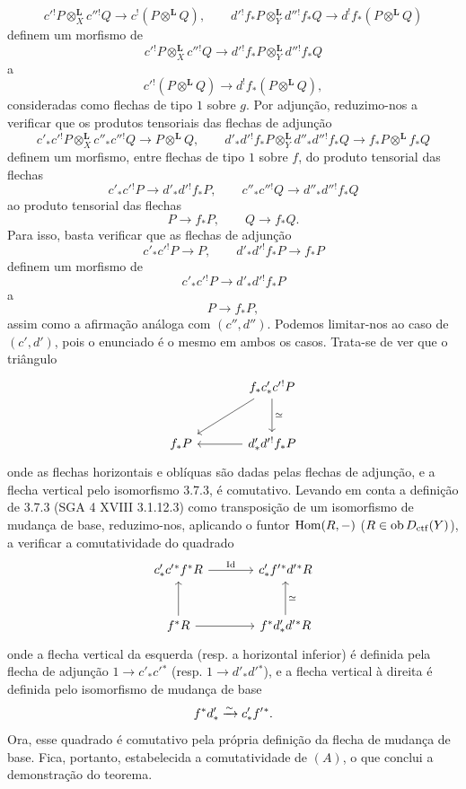 \begin{prooftext}[Demonstração]
\[
c'{}^!P\otimes_X^{\mathbf L}c''{}^!Q\longrightarrow c^!(P\otimes^{\mathbf L}Q),\qquad
d'{}^!f_*P\otimes_Y^{\mathbf L}d''{}^!f_*Q\longrightarrow d^!f_*(P\otimes^{\mathbf L}Q)
\]
definem um morfismo de
\[
c'{}^!P\otimes_X^{\mathbf L}c''{}^!Q\longrightarrow d'{}^!f_*P\otimes_Y^{\mathbf L}d''{}^!f_*Q
\]
a
\[
c'{}^!(P\otimes^{\mathbf L}Q)\longrightarrow d^!f_*(P\otimes^{\mathbf L}Q),
\]
consideradas como flechas de tipo $1$ sobre $g$. Por adjunção, reduzimo-nos a verificar que os produtos tensoriais das flechas de adjunção
\[
c'_*c'{}^!P\otimes_X^{\mathbf L}c''_*c''{}^!Q\longrightarrow P\otimes^{\mathbf L}Q,
\qquad
d'_*d'{}^!f_*P\otimes_Y^{\mathbf L}d''_*d''{}^!f_*Q
\longrightarrow f_*P\otimes^{\mathbf L}f_*Q
\]
definem um morfismo, entre flechas de tipo $1$ sobre $f$, do produto tensorial das flechas
\[
c'_*c'{}^!P\longrightarrow d'_*d'{}^!f_*P,\qquad
c''_*c''{}^!Q\longrightarrow d''_*d''{}^!f_*Q
\]
ao produto tensorial das flechas
\[
P\longrightarrow f_*P,\qquad Q\longrightarrow f_*Q.
\]
Para isso, basta verificar que as flechas de adjunção
\[
c'_*c'{}^!P\longrightarrow P,\qquad d'_*d'{}^!f_*P\longrightarrow f_*P
\]
definem um morfismo de
\[
c'_*c'{}^!P\longrightarrow d'_*d'{}^!f_*P
\]
a
\[
P\longrightarrow f_*P,
\]
assim como a afirmação análoga com $(c'',d'')$. Podemos limitar-nos ao caso de $(c',d')$, pois o enunciado é o mesmo em ambos os casos. Trata-se de ver que o triângulo
\[
\begin{tikzcd}[column sep=large,row sep=large]
& f_*c'_*c'{}^!P \arrow[d,"\simeq"]\arrow[dl]\\
f_*P & d'_*d'{}^!f_*P\arrow[l]
\end{tikzcd}
\]
onde as flechas horizontais e oblíquas são dadas pelas flechas de adjunção, e a flecha vertical pelo isomorfismo 3.7.3, é comutativo. Levando em conta a definição de 3.7.3 (SGA 4 XVIII 3.1.12.3) como transposição de um isomorfismo de mudança de base, reduzimo-nos, aplicando o funtor $\operatorname{Hom}(R,-)$ ($R\in\operatorname{ob}D_{\mathrm{ctf}}(Y)$), a verificar a comutatividade do quadrado
\[
\begin{tikzcd}[column sep=large,row sep=large]
c'_*c'{}^*f^*R \arrow[r,"\Id"] &
c'_*f'{}^*d'{}^*R\\
f^*R \arrow[u] \arrow[r] &
f^*d'_*d'{}^*R\arrow[u,"\simeq"']
\end{tikzcd}
\]
onde a flecha vertical da esquerda (resp. a horizontal inferior) é definida pela flecha de adjunção $1\longrightarrow c'_*c'{}^*$ (resp. $1\longrightarrow d'_*d'{}^*$), e a flecha vertical à direita é definida pelo isomorfismo de mudança de base
\[
f^*d'_*\xrightarrow{\sim} c'_*f'{}^*.
\]
Ora, esse quadrado é comutativo pela própria definição da flecha de mudança de base. Fica, portanto, estabelecida a comutatividade de $(A)$, o que conclui a demonstração do teorema.
\end{prooftext}
